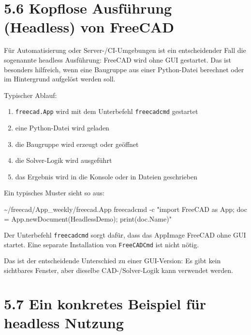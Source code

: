 \documentclass[
  12pt
]{book}
\newenvironment{Shaded}{}{}
\newcommand{\AttributeTok}[1]{\textcolor[rgb]{0.49,0.56,0.16}{#1}}
\newcommand{\ExtensionTok}[1]{#1}
\newcommand{\NormalTok}[1]{#1}
\newcommand{\StringTok}[1]{\textcolor[rgb]{0.25,0.44,0.63}{#1}}
\providecommand{\tightlist}{%
  \setlength{\itemsep}{0pt}\setlength{\parskip}{0pt}}
\begin{document}
\hypertarget{kopflose-ausfuxfchrung-headless-von-freecad}{%
\section{\texorpdfstring{{5.6} Kopflose Ausführung (Headless) von
FreeCAD}{5.6 Kopflose Ausführung (Headless) von FreeCAD}}\label{kopflose-ausfuxfchrung-headless-von-freecad}}

Für Automatisierung oder Server-/CI-Umgebungen ist ein entscheidender
Fall die sogenannte headless Ausführung: FreeCAD wird ohne GUI
gestartet. Das ist besonders hilfreich, wenn eine Baugruppe aus einer
Python-Datei berechnet oder im Hintergrund aufgelöst werden soll.

Typischer Ablauf:

\begin{enumerate}
\def\labelenumi{\arabic{enumi}.}
\tightlist
\item
  \texttt{freecad.App} wird mit dem Unterbefehl \texttt{freecadcmd}
  gestartet
\item
  eine Python-Datei wird geladen
\item
  die Baugruppe wird erzeugt oder geöffnet
\item
  die Solver-Logik wird ausgeführt
\item
  das Ergebnis wird in die Konsole oder in Dateien geschrieben
\end{enumerate}

Ein typisches Muster sieht so aus:

\begin{Shaded}
\begin{Highlighting}[]
\ExtensionTok{\textasciitilde{}/freecad/App\_weekly/freecad.App}\NormalTok{ freecadcmd }\AttributeTok{{-}c} \StringTok{"import FreeCAD as App; doc = App.newDocument(\textquotesingle{}HeadlessDemo\textquotesingle{}); print(doc.Name)"}
\end{Highlighting}
\end{Shaded}

Der Unterbefehl \texttt{freecadcmd} sorgt dafür, dass das AppImage
FreeCAD ohne GUI startet. Eine separate Installation von
\texttt{FreeCADCmd} ist nicht nötig.

Das ist der entscheidende Unterschied zu einer GUI-Version: Es gibt kein
sichtbares Fenster, aber dieselbe CAD-/Solver-Logik kann verwendet
werden.

\hypertarget{ein-konkretes-beispiel-fuxfcr-headless-nutzung}{%
\section{\texorpdfstring{{5.7} Ein konkretes Beispiel für headless
Nutzung}{5.7 Ein konkretes Beispiel für headless Nutzung}}\label{ein-konkretes-beispiel-fuxfcr-headless-nutzung}}
\end{document}
